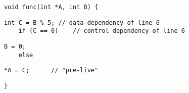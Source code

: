\begin{lstlisting}[style=cppcode]
  void func(int *A, int B) {
\end{lstlisting}

\begin{lstlisting}[style=cppcode, backgroundcolor=\color{green!15}, firstnumber=last]
    int C = B % 5; // data dependency of line 6
    if (C == 0)    // control dependency of line 6
\end{lstlisting}

\begin{lstlisting}[style=cppcode, firstnumber=last]
      B = 0;
    else
\end{lstlisting}

\begin{lstlisting}[style=cppcode, backgroundcolor=\color{green!15}, firstnumber=last]
      *A = C;      // "pre-live"
\end{lstlisting}

\begin{lstlisting}[style=cppcode, firstnumber=last]
  }
\end{lstlisting}

